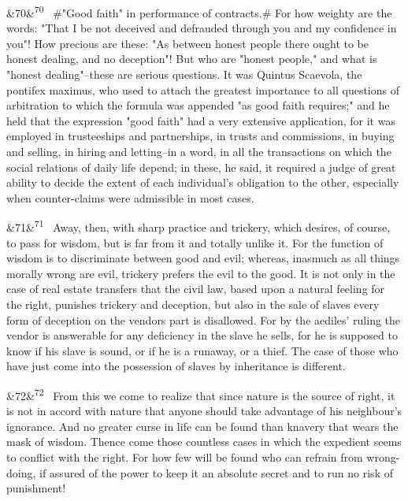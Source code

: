 \documentclass[12pt]{article}
\newcommand{\para}[1][]{\par\noindent\ifx&#1&\else\textsuperscript{\footnotesize #1}~\fi}
\begin{document}
\para[70] \#"Good faith" in performance of contracts.\# For how weighty are the words: "That I be not deceived and defrauded through you and my confidence in you"! How precious are these: "As between honest people there ought to be honest dealing, and no deception"! But who are "honest people," and what is "honest dealing"--these are serious questions. It was Quintus Scaevola, the pontifex maximus, who used to attach the greatest importance to all questions of arbitration to which the formula was appended "as good faith requires;" and he held that the expression "good faith" had a very extensive application, for it was employed in trusteeships and partnerships, in trusts and commissions, in buying and selling, in hiring and letting--in a word, in all the transactions on which the social relations of daily life depend; in these, he said, it required a judge of great ability to decide the extent of each individual's obligation to the other, especially when counter-claims were admissible in most cases.

\para[71] Away, then, with sharp practice and trickery, which desires, of course, to pass for wisdom, but is far from it and totally unlike it. For the function of wisdom is to discriminate between good and evil; whereas, inasmuch as all things morally wrong are evil, trickery prefers the evil to the good. It is not only in the case of real estate transfers that the civil law, based upon a natural feeling for the right, punishes trickery and deception, but also in the sale of slaves every form of deception on the vendors part is disallowed. For by the aediles' ruling the vendor is answerable for any deficiency in the slave he sells, for he is supposed to know if his slave is sound, or if he is a runaway, or a thief. The case of those who have just come into the possession of slaves by inheritance is different.

\para[72] From this we come to realize that since nature is the source of right, it is not in accord with nature that anyone should take advantage of his neighbour's ignorance. And no greater curse in life can be found than knavery that wears the mask of wisdom. Thence come those countless cases in which the expedient seems to conflict with the right. For how few will be found who can refrain from wrong-doing, if assured of the power to keep it an absolute secret and to run no risk of punishment!
\end{document}
